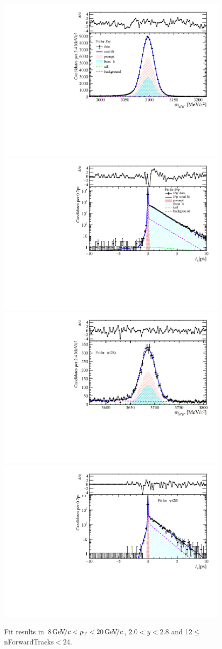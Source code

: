 \begin{figure}[H]
\begin{center}
\includegraphics[width=0.47\linewidth]{pdf/Jpsi/drawmassF/n2y1pt5.pdf}
\includegraphics[width=0.47\linewidth]{pdf/Jpsi/2DFitF/n2y1pt5.pdf}
\vspace*{-0.5cm}
\includegraphics[width=0.47\linewidth]{pdf/Psi2S/drawmassF/n2y1pt5.pdf}
\includegraphics[width=0.47\linewidth]{pdf/Psi2S/2DFitF/n2y1pt5.pdf}
\vspace*{-0.5cm}
\end{center}
\caption{Fit results in $8\text{\,Ge\kern -0.1em V\!/}c<p_{\mathrm{T}}<20\text{\,Ge\kern -0.1em V\!/}c$, $2.0<y<2.8$ and 12$\leq$nForwardTracks$<$24.}
\label{Fitn2y1pt5}
\end{figure}
